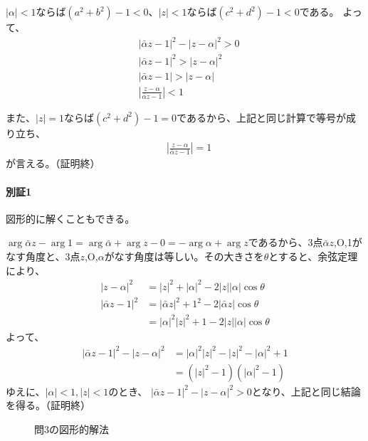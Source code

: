 $|\alpha|<1$ならば$(a^2+b^2)-1<0$、$|z|<1$ならば$(c^2+d^2)-1<0$である。
よって、
\begin{align*}
    &|\bar{\alpha}z-1|^2-|z-\alpha|^2>0\\
    &|\bar{\alpha}z-1|^2>|z-\alpha|^2\\
    &|\bar{\alpha}z-1|>|z-\alpha|\\
    &\left|\frac{z-\alpha}{\bar{\alpha}z-1}\right|<1
\end{align*}

また、$|z|=1$ならば$(c^2+d^2)-1=0$であるから、上記と同じ計算で等号が成り立ち、
\begin{align*}
    &\left|\frac{z-\alpha}{\bar{\alpha}z-1}\right|=1
\end{align*}
が言える。（証明終）

\paragraph{別証1}

図形的に解くこともできる。

$\arg\bar{\alpha}z-\arg 1=\arg\bar{\alpha}+\arg z-0=-\arg\alpha+\arg z$であるから、3点$\bar{\alpha}z$,O,1がなす角度と、3点$z$,O,$\alpha$がなす角度は等しい。その大きさを$\theta$とすると、余弦定理により、
\begin{align*}
    |z-\alpha|^2&=|z|^2+|\alpha|^2-2|z||\alpha|\cos\theta\\
    |\bar{\alpha}z-1|^2&=|\bar{\alpha}z|^2+1^2-2|\bar{\alpha}z|\cos\theta\\
    &=|\alpha|^2|z|^2+1-2|z||\alpha|\cos\theta
\end{align*}
よって、
\begin{align*}
    |\bar{\alpha}z-1|^2-|z-\alpha|^2&=|\alpha|^2|z|^2-|z|^2-|\alpha|^2+1\\
    &=(|z|^2-1)(|\alpha|^2-1)
\end{align*}
ゆえに、$|\alpha|<1, |z|<1$のとき、 $|\bar{\alpha}z-1|^2-|z-\alpha|^2>0$となり、上記と同じ結論を得る。（証明終）
\begin{figure}
    \centering
{}
\caption{問3の図形的解法}
\end{figure}

